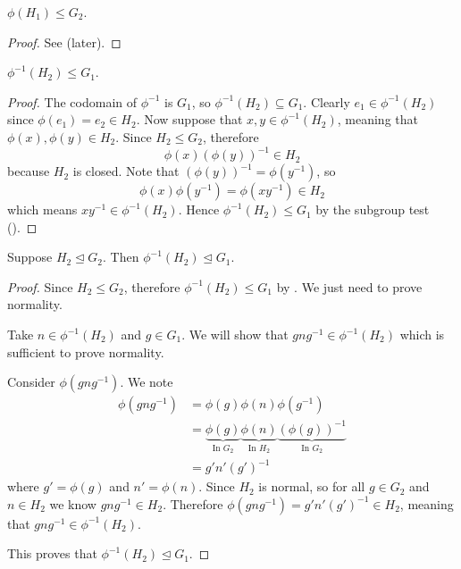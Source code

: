 \begin{proposition}\label{prop-homomorphism-image-is-subgroup}
    $\phi(H_1) \leq G_2$.
\end{proposition}
\begin{proof}
    See  (later).
\end{proof}

\begin{proposition}\label{prop-homomorphism-inverse-is-subgroup}
    $\phi^{-1}(H_2) \leq G_1$.
\end{proposition}
\begin{proof}
    The codomain of $\phi^{-1}$ is $G_1$, so $\phi^{-1}(H_2) \subseteq G_1$. Clearly $e_1 \in \phi^{-1}(H_2)$ since $\phi(e_1) = e_2 \in H_2$. Now suppose that $x, y \in \phi^{-1}(H_2)$, meaning that $\phi(x), \phi(y) \in H_2$. Since $H_2 \leq G_2$, therefore
    \[
        \phi(x)\left(\phi(y)\right)^{-1} \in H_2
    \]
    because $H_2$ is closed. Note that $\left(\phi(y)\right)^{-1} = \phi(y^{-1})$, so
    \[
        \phi(x)\phi(y^{-1}) = \phi(xy^{-1}) \in H_2
    \]
    which means $xy^{-1} \in \phi^{-1}(H_2)$. Hence $\phi^{-1}(H_2) \leq G_1$ by the subgroup test ().
\end{proof}

\begin{proposition}
    Suppose $H_2 \unlhd G_2$. Then $\phi^{-1}(H_2) \unlhd G_1$.
\end{proposition}
\begin{proof}
    Since $H_2 \leq G_2$, therefore $\phi^{-1}(H_2) \leq G_1$ by . We just need to prove normality.

    Take $n \in \phi^{-1}(H_2)$ and $g \in G_1$. We will show that $gng^{-1} \in \phi^{-1}(H_2)$ which is sufficient to prove normality.

    Consider $\phi(gng^{-1})$. We note
    \begin{align*}
        \phi(gng^{-1}) &= \phi(g)\phi(n)\phi(g^{-1}) \\
        &= \underbrace{\phi(g)}_{\text{In }G_2} \underbrace{\phi(n)}_{\text{In }H_2} \underbrace{\left(\phi(g)\right)^{-1}}_{\text{In }G_2}\\
        &= g'n'(g')^{-1}
    \end{align*}
    where $g' = \phi(g)$ and $n' = \phi(n)$. Since $H_2$ is normal, so for all $g \in G_2$ and $n \in H_2$ we know $gng^{-1} \in H_2$. Therefore $\phi(gng^{-1}) = g'n'(g')^{-1} \in H_2$, meaning that $gng^{-1} \in \phi^{-1}(H_2)$.

    This proves that $\phi^{-1}(H_2) \unlhd G_1$.
\end{proof}

